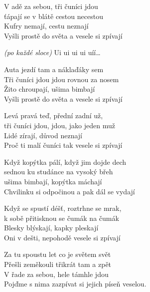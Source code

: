 
\ve{}
V adě za sebou, tři čuníci jdou\\
ťápají se v blátě cestou necestou\\
Kufry nemají, cestu neznají\\
Vyšli prostě do světa a vesele si zpívají

\cho{}
\textit{(po každé sloce)}
Ui ui ui ui uíí\ldots{}

\ve{}
Auta jezdí tam a náklaďáky sem\\
Tři čuníci jdou jdou rovnou za nosem\\
Žito chroupají, ušima bimbají\\
Vyšli prostě do světa a vesele si zpívají

\ve{}
Levá pravá teď, přední zadní už,\\
tři čuníci jdou, jdou, jako jeden muž\\
Lidé zírají, důvod neznají\\
Proč ti malí čuníci tak vesele si zpívají

\ve{}
Když kopýtka pálí, když jim dojde dech\\
sednou ku studánce na vysoký břeh\\
ušima bimbají, kopýtka máchají\\
Chvilinku si odpočinou a pak dál se vydají

\ve{}
Když se spustí déšť, roztrhne se mrak,\\
k sobě přitisknou se čumák na čumák\\
Blesky blýskají, kapky pleskají\\
Oni v dešti, nepohodě vesele si zpívají

\ve{}
Za tu spoustu let co je světem svět\\
Přešli zeměkouli třikrát tam a zpět\\
V řade za sebou, hele támhle jdou\\
Pojďme s nima zazpívat si jejich píseň veselou. 

\esong